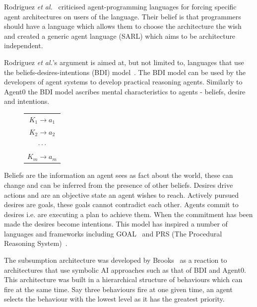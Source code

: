 \documentclass[]{final_report}
\begin{document}
Rodriguez \textit{et al.}~\cite{rodriguez2014sarl} criticised agent-programming languages for forcing specific agent architectures on users of the language. Their belief is that programmers should have a language which allows them to choose the architecture the wish and created a generic agent language (SARL) which aims to be architecture independent.\par 
Rodriguez \textit{et al.}'s argument is aimed at, but not limited to, languages that use the beliefs-desires-intentions (BDI) model~\cite{bratman1987intention}. The BDI model can be used by the developers of agent systems to develop practical reasoning agents. Similarly to Agent0 the BDI model ascribes mental characteristics to agents - beliefs, desire and intentions.\par 
\begin{figure}
\vspace{-30pt}
\begin{framed}
	\begin{center}
		\begin{tabular}{c}
		$K_1 \rightarrow a_1$\\
		$K_2 \rightarrow a_2$\\
		$\cdot \cdot \cdot$\\
		$K_m \rightarrow a_m$
		\end{tabular}
		\label{tab:trrules}
	\end{center}	
\end{framed}
\vspace{-20pt}
\end{figure}
Beliefs are the information an agent sees as fact about the world, these can change and can be inferred from the presence of other beliefs. Desires drive actions and are an objective state an agent wishes to reach. Actively pursued desires are goals, these goals cannot contradict each other. Agents commit to desires i.e. are executing a plan to achieve them. When the commitment has been made the desires become intentions. This model has inspired a number of languages and frameworks including GOAL~\cite{hindriks2000agent} and PRS (The Procedural Reasoning System)~\cite{georgeff1987reactive}.\par 
The subsumption architecture was developed by Brooks~\cite{brooks1991intelligence} as a reaction to architectures that use symbolic AI approaches such as that of BDI and Agent0. This architecture was built in a hierarchical structure of behaviours which can fire at the same time. Say three behaviours fire at one given time, an agent selects the behaviour with the lowest level as it has the greatest priority.\par 
\end{document}
